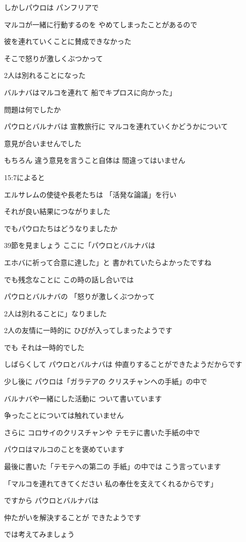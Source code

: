 \documentclass[twocolumn]{jsarticle}
\begin{document}
しかしパウロは パンフリアで

マルコが一緒に行動するのを
やめてしまったことがあるので

彼を連れていくことに賛成できなかった

そこで怒りが激しくぶつかって

2人は別れることになった

バルナバはマルコを連れて
船でキプロスに向かった」

問題は何でしたか

パウロとバルナバは 宣教旅行に
マルコを連れていくかどうかについて

意見が合いませんでした

もちろん 違う意見を言うこと自体は
間違ってはいません

15:7によると

エルサレムの使徒や長老たちは
「活発な論議」を行い

それが良い結果につながりました

でもパウロたちはどうなりましたか

39節を見ましょう
ここに「パウロとバルナバは

エホバに祈って合意に達した」と
書かれていたらよかったですね

でも残念なことに
この時の話し合いでは

パウロとバルナバの
「怒りが激しくぶつかって

2人は別れることに」なりました

2人の友情に一時的に
ひびが入ってしまったようです

でも それは一時的でした

しばらくして パウロとバルナバは
仲直りすることができたようだからです

少し後に パウロは「ガラテアの
クリスチャンへの手紙」の中で

バルナバや一緒にした活動に
ついて書いています

争ったことについては触れていません

さらに コロサイのクリスチャンや
テモテに書いた手紙の中で

パウロはマルコのことを褒めています

最後に書いた「テモテへの第二の
手紙」の中では こう言っています

「マルコを連れてきてください
私の奉仕を支えてくれるからです」

ですから パウロとバルナバは

仲たがいを解決することが
できたようです

では考えてみましょう
\end{document}
